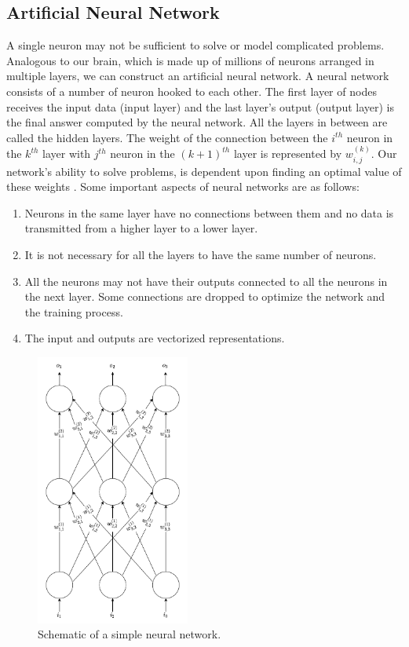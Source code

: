 \subsection{Artificial Neural Network}
A single neuron may not be sufficient to solve or model complicated problems. Analogous to our brain, which is made up of millions of neurons arranged in multiple layers, we can construct an artificial neural network. A neural network consists of a number of neuron hooked to each other. The first layer of nodes receives the input data (input layer) and the last layer's output  (output layer) is the final answer computed by the neural network.  All the layers in between are called the hidden layers. The weight of the connection between the $i^{th}$ neuron in the $k^{th}$ layer with $j^{th}$ neuron in the $(k+1)^{th}$ layer is represented by $w_{i,j}^{(k)}$. Our network's ability to solve problems, is dependent upon finding an optimal value of these weights \cite{buduma2017fundamentals}. Some important aspects of neural networks are as follows:

\begin{enumerate}
\item	Neurons in the same layer have no connections between them and no data is transmitted from a higher layer to a lower layer.
\item	It is not necessary for all the layers to have the same number of neurons.
\item	All the neurons may not have their outputs connected to all the neurons in the next layer. Some connections are dropped to optimize the network and the training process.
\item The input and outputs are vectorized representations.
\end{enumerate}

\begin{figure}[!h]
	\centering
	\includegraphics[width=0.45\textwidth]{Pictures/hdaannnpng.png}
	\hspace{1mm}
	\caption{Schematic of a simple neural network.} 
	\label{fig:nn}
\end{figure}

